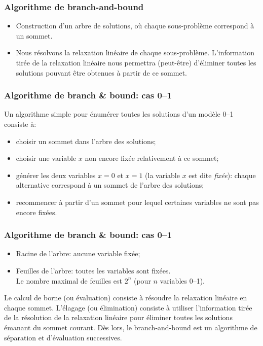\documentclass[usepdftitle=false]{beamer}
\begin{document}
\begin{frame}
\frametitle{Algorithme de branch-and-bound}

\begin{itemize}
	\item 
Construction d'un arbre de solutions, où chaque sous-problème correspond à un sommet.
\item 
Nous résolvons la relaxation linéaire de chaque sous-problème.
L'information tirée de la relaxation linéaire nous permettra (peut-être) d'éliminer toutes les solutions pouvant être obtenues à partir de ce sommet.
\end{itemize}

\end{frame}

\begin{frame}
\frametitle{Algorithme de branch \& bound: cas 0--1}

Un algorithme simple pour énumérer toutes les solutions d'un modèle 0--1 consiste à:
\begin{itemize}
\item
choisir un sommet dans l'arbre des solutions;
\item
choisir une variable $x$ non encore fixée relativement à ce sommet;
\item
générer les deux variables $x = 0$ et $x = 1$ (la variable $x$ est dite {\sl fixée}): chaque alternative correspond à un sommet de l'arbre des solutions;
\item
recommencer à partir d'un sommet pour lequel certaines variables ne sont pas encore fixées.
\end{itemize}

\end{frame}

\begin{frame}
\frametitle{Algorithme de branch \& bound: cas 0--1}

\begin{itemize}
	\item 
Racine de l'arbre: aucune variable fixée;
\item
Feuilles de l'arbre: toutes les variables sont fixées.\\
Le nombre maximal de feuilles est $2^n$ (pour $n$ variables 0--1).
\end{itemize}

\mbox{}

Le calcul de borne (ou évaluation) consiste à résoudre la relaxation linéaire en chaque sommet.
L'élagage (ou élimination) consiste à utiliser l'information tirée de la résolution de la relaxation linéaire pour éliminer toutes les solutions émanant du sommet courant.
Dès lors, le branch-and-bound est un algorithme de séparation et d'évaluation successives.

\end{frame}
\end{document}
